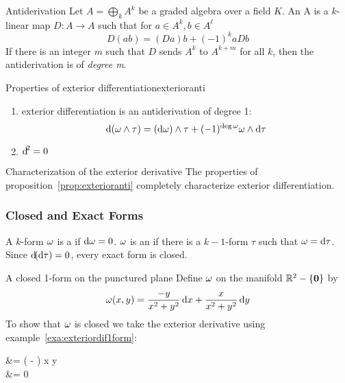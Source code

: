\begin{definition}{Antiderivation}
    Let \(A = \bigoplus_k A^k\) be a graded algebra over a field \(K\). An  A is a \(k\)-linear map \(D \colon A \rightarrow A\) such that for \(a \in A^k, b \in A^\ell\)
    \begin{equation}
        D(ab) = (Da)b + (-1)^kaDb
    \end{equation}
    If there is an integer \(m\) such that \(D\) sends \(A^k\) to \(A^{k+m}\) for all \(k\), then the antiderivation is of \textit{degree m}.
\end{definition}
%
\begin{proposition}{Properties of exterior differentiation}{exterioranti}
    \begin{enumerate}
        \item exterior differentiation is an antiderivation of degree 1:
              \[\dif\, (\w \wedge \tau) = (\dif \w) \wedge \tau + (-1)^{\deg \omega} \omega \wedge \dif \tau\]
        \item \(\dif^2 = 0\)
    \end{enumerate}
\end{proposition}
%
\begin{proposition}{Characterization of the exterior derivative}{}
    The properties of proposition~\eqref{prop:exterioranti} completely characterize exterior differentiation.
\end{proposition}

\subsubsection{Closed and Exact Forms}

A \(k\)-form \(\omega\) is a  if \(\dif \w = 0\).
%
\(\omega\) is an  if there is a \(k-1\)-form \(\tau\) such that \(\w = \dif \tau\).
%
Since \(\dif (\dif \tau) = 0\), every exact form is closed.

\begin{example}{A closed 1-form on the punctured plane}{}
    Define \(\omega\) on the manifold \(\mathbb{R}^2-\{\bm{0}\}\) by 
    \[
        \omega(x,y) = \frac{-y}{x^2+y^2}\dif x + \frac{x}{x^2+y^2}\dif y
    \]
    To show that \(\omega\) is closed we take the exterior derivative using example~\eqref{exa:exteriordif1form}:
    \begin{splitenv}
        \dif \w &= \left(  -  \right) \dif x \wedge \dif y \\ 
        &= 0
    \end{splitenv}
\end{example}

